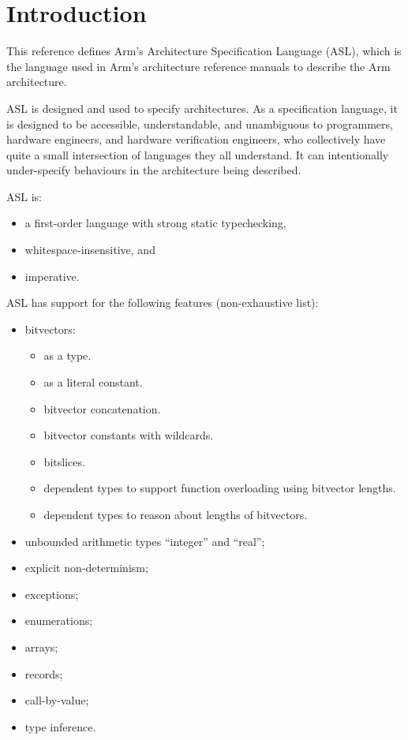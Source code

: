 \chapter{Introduction\label{chap:Introduction}}

This reference defines Arm’s Architecture Specification Language (ASL), which is the language
used in Arm’s architecture reference manuals to describe the Arm architecture.

ASL is designed and used to specify architectures. As a specification language, it is designed to be accessible,
understandable, and unambiguous to programmers, hardware
engineers, and hardware verification engineers, who collectively have quite a small intersection of languages they
all understand. It can intentionally under-specify behaviours in the architecture being described.

ASL is:
\begin{itemize}
    \item a first-order language with strong static typechecking,
    \item whitespace-insensitive, and
    \item imperative.
\end{itemize}

ASL has support for the following features (non-exhaustive list):
\begin{itemize}
    \item bitvectors:
    \begin{itemize}
        \item as a type.
        \item as a literal constant.
        \item bitvector concatenation.
        \item bitvector constants with wildcards.
        \item bitslices.
        \item dependent types to support function overloading using bitvector lengths.
        \item dependent types to reason about lengths of bitvectors.
    \end{itemize}
    \item unbounded arithmetic types “integer” and “real”;
    \item explicit non-determinism;
    \item exceptions;
    \item enumerations;
    \item arrays;
    \item records;
    \item call-by-value;
    \item type inference.
\end{itemize}

